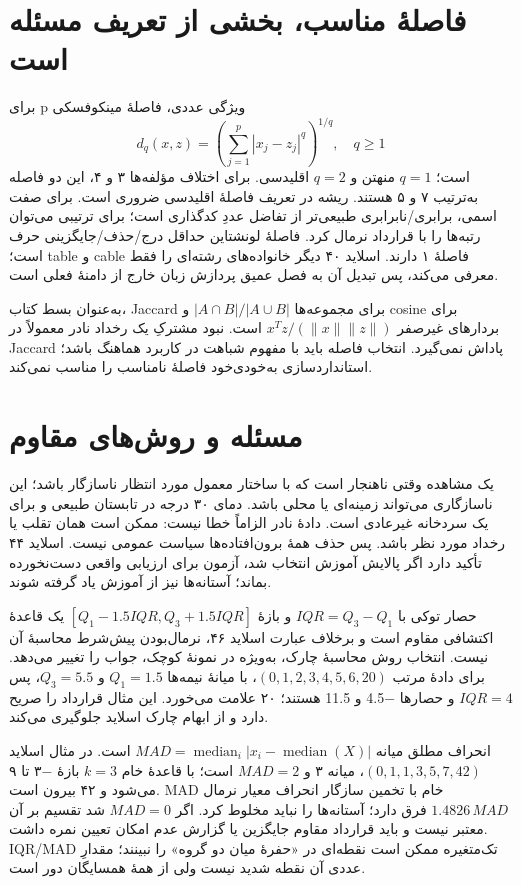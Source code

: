 \section{فاصلهٔ مناسب، بخشی از تعریف مسئله است}

برای p ویژگی عددی، فاصلهٔ مینکوفسکی \[
d_q(x,z)=\left(\sum_{j=1}^p|x_j-z_j|^q\right)^{1/q},\quad q\ge1
\] است؛ $q=1$ منهتن و $q=2$ اقلیدسی. برای اختلاف مؤلفه‌ها ۳ و ۴، این دو فاصله به‌ترتیب ۷ و ۵ هستند. ریشه در تعریف فاصلهٔ اقلیدسی ضروری است. برای صفت اسمی، برابری/نابرابری طبیعی‌تر از تفاضل عددِ کدگذاری است؛ برای ترتیبی می‌توان رتبه‌ها را با قرارداد نرمال کرد. فاصلهٔ لونشتاین حداقل درج/حذف/جایگزینی حرف است؛ table و cable فاصلهٔ ۱ دارند. اسلاید ۴۰ دیگر خانواده‌های رشته‌ای را فقط معرفی می‌کند، پس تبدیل آن به فصل عمیق پردازش زبان خارج از دامنهٔ فعلی است.

به‌عنوان بسط کتاب، Jaccard برای مجموعه‌ها \(|A\cap B|/|A\cup B|\) و cosine برای بردارهای غیرصفر \(x^Tz/(\|x\|\|z\|)\) است. نبود مشترکِ یک رخداد نادر معمولاً در Jaccard پاداش نمی‌گیرد. انتخاب فاصله باید با مفهوم شباهت در کاربرد هماهنگ باشد؛ استانداردسازی به‌خودی‌خود فاصلهٔ نامناسب را مناسب نمی‌کند.

\section{مسئله و روش‌های مقاوم}

یک مشاهده وقتی ناهنجار است که با ساختار معمول مورد انتظار ناسازگار باشد؛ این ناسازگاری می‌تواند زمینه‌ای یا محلی باشد. دمای ۳۰ درجه در تابستان طبیعی و برای یک سردخانه غیرعادی است. دادهٔ نادر الزاماً خطا نیست: ممکن است همان تقلب یا رخداد مورد نظر باشد. پس حذف همهٔ برون‌افتاده‌ها سیاست عمومی نیست. اسلاید ۴۴ تأکید دارد اگر پالایش آموزش انتخاب شد، آزمون برای ارزیابی واقعی دست‌نخورده بماند؛ آستانه‌ها نیز از آموزش یاد گرفته شوند.

حصار توکی با \(IQR=Q_3-Q_1\) و بازهٔ \([Q_1-1.5IQR,Q_3+1.5IQR]\) یک قاعدهٔ اکتشافی مقاوم است و برخلاف عبارت اسلاید ۴۶، نرمال‌بودن پیش‌شرط محاسبهٔ آن نیست. انتخاب روش محاسبهٔ چارک، به‌ویژه در نمونهٔ کوچک، جواب را تغییر می‌دهد. برای دادهٔ مرتب \((0,1,2,3,4,5,6,20)\)، با میانهٔ نیمه‌ها $Q_1=1.5$ و $Q_3=5.5$، پس $IQR=4$ و حصارها −4.5 و 11.5 هستند؛ ۲۰ علامت می‌خورد. این مثال قرارداد را صریح دارد و از ابهام چارک اسلاید جلوگیری می‌کند.

انحراف مطلق میانه \(MAD=\operatorname{median}_i|x_i-\operatorname{median}(X)|\) است. در مثال اسلاید \((0,1,1,3,5,7,42)\)، میانه ۳ و $MAD=2$ است؛ با قاعدهٔ خام $k=3$ بازهٔ −۳ تا ۹ می‌شود و ۴۲ بیرون است. MAD خام با تخمین سازگار انحراف معیار نرمال \(1.4826\,MAD\) فرق دارد؛ آستانه‌ها را نباید مخلوط کرد. اگر $MAD=0$ شد تقسیم بر آن معتبر نیست و باید قرارداد مقاوم جایگزین یا گزارش عدم امکان تعیین نمره داشت. IQR/MAD تک‌متغیره ممکن است نقطه‌ای در «حفرهٔ میان دو گروه» را نبینند؛ مقدارِ عددی آن نقطه شدید نیست ولی از همهٔ همسایگان دور است.

